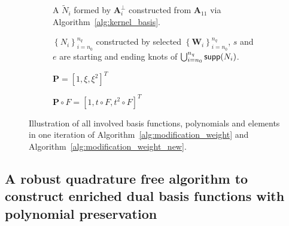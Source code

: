 \begin{figure}[ht]
	\begin{subfigure}{\linewidth}
		\center
		\caption{A $\tilde{N}_i$ formed by $\mathbf{A}_i^\perp$ constructed from $\mathbf{A}_{11}$ via Algorithm~\ref{alg:kernel_basis}.}\label{fig:weight-modification-a}
	\end{subfigure}
	\begin{subfigure}{\linewidth}
		\center
		\caption{$\left\{N_i\right\}_{i=n_0}^{n_q}$ constructed by selected $\left\{\mathbf{W}_i\right\}_{i=n_0}^{n_q}$, $s$ and $e$ are starting and ending knots of $\bigcup_{i=n_0}^{n_q}\mathop{\mathsf{supp}}(N_i)$.}\label{fig:weight-modification-b}
	\end{subfigure}
	\begin{subfigure}{\linewidth}
		\center
		\caption{$\mathbf{P}=\left[1, \xi, \xi^2\right]^T$}\label{fig:weight-modification-c}
	\end{subfigure}
	\begin{subfigure}{\linewidth}
		\center
		\caption{$\mathbf{P}\circ F=\left[1, t \circ F, t^2 \circ F\right]^T$}\label{fig:weight-modification-d}
	\end{subfigure}
	\caption{Illustration of all involved basis functions, polynomials and elements in one iteration of Algorithm~\ref{alg:modification_weight} and Algorithm~\ref{alg:modification_weight_new}. }
	\label{fig:weight-modification-algorithm}
\end{figure}

\subsection{A robust quadrature free algorithm to construct enriched dual basis functions with polynomial preservation}

